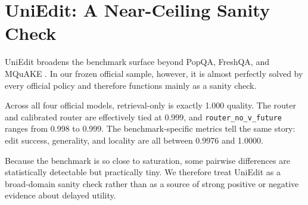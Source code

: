 \section{UniEdit: A Near-Ceiling Sanity Check}

UniEdit broadens the benchmark surface beyond PopQA, FreshQA, and MQuAKE \citep{chen2025uniedit}. In our frozen official sample, however, it is almost perfectly solved by every official policy and therefore functions mainly as a sanity check.

\begin{table}[h]
\centering
\small

\caption{Official UniEdit summary. All policies are near ceiling, so the benchmark is useful for breadth but largely nondiagnostic for router superiority in this setup.}
\label{tab:uniedit-main}
\end{table}

Across all four official models, retrieval-only is exactly 1.000 quality. The router and calibrated router are effectively tied at 0.999, and \texttt{router\_no\_v\_future} ranges from 0.998 to 0.999. The benchmark-specific metrics tell the same story: edit success, generality, and locality are all between 0.9976 and 1.0000.

Because the benchmark is so close to saturation, some pairwise differences are statistically detectable but practically tiny. We therefore treat UniEdit as a broad-domain sanity check rather than as a source of strong positive or negative evidence about delayed utility.
